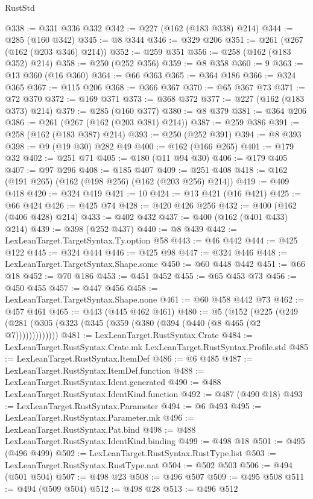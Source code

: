 \begin{lexlean}{RustStd}
\begin{coremodule}
@338 := @331 @336 @332
@342 := @227 (@162 (@183 @338) @214)
@344 := @285 (@160 @342)
@345 := @8 @344
@346 := @329 @206
@351 := @261 (@267 (@162 (@203 @346) @214))
@352 := @259 @351
@356 := @258 (@162 (@183 @352) @214)
@358 := @250 (@252 @356)
@359 := @8 @358
@360 := 9
@363 := @13 @360 (@16 @360)
@364 := @66 @363
@365 := @364 @186
@366 := @324 @365
@367 := @115 @206
@368 := @366 @367
@370 := @65 @367 @73
@371 := @72 @370
@372 := @169 @371
@373 := @368 @372
@377 := @227 (@162 (@183 @373) @214)
@379 := @285 (@160 @377)
@380 := @8 @379
@381 := @364 @206
@386 := @261 (@267 (@162 (@203 @381) @214))
@387 := @259 @386
@391 := @258 (@162 (@183 @387) @214)
@393 := @250 (@252 @391)
@394 := @8 @393
@398 := @9 (@19 @30) @282 @49
@400 := @162 (@166 @265)
@401 := @179 @32
@402 := @251 @71
@405 := @180 (@11 @94 @30)
@406 := @179 @405
@407 := @97 @296
@408 := @185 @407
@409 := @251 @408
@418 := @162 (@191 @265) (@162 (@198 @256) (@162 (@203 @256) @214))
@419 := @409 @418
@420 := @324 @419
@421 := 10
@424 := @13 @421 (@16 @421)
@425 := @66 @424
@426 := @425 @74
@428 := @420 @426 @256
@432 := @400 (@162 (@406 @428) @214)
@433 := @402 @432
@437 := @400 (@162 (@401 @433) @214)
@439 := @398 (@252 @437)
@440 := @8 @439
@442 := LexLeanTarget.TargetSyntax.Ty.option @58
@443 := @46 @442
@444 := @425 @122
@445 := @324 @444
@446 := @425 @98
@447 := @324 @446
@448 := LexLeanTarget.TargetSyntax.Shape.some
@450 := @60 @448 @442
@451 := @66 @18
@452 := @70 @186
@453 := @451 @452
@455 := @65 @453 @73
@456 := @450 @455
@457 := @447 @456
@458 := LexLeanTarget.TargetSyntax.Shape.none
@461 := @60 @458 @442 @73
@462 := @457 @461
@465 := @443 (@445 @462 @461)
@480 := @5
    (@152 (@225 (@249 (@281 (@305 (@323 (@345 (@359 (@380 (@394 (@440 (@8 @465 (@2 @7)))))))))))))
@481 := LexLeanTarget.RustSyntax.Crate
@484 := LexLeanTarget.RustSyntax.Crate.mk LexLeanTarget.RustSyntax.Profile.std
@485 := LexLeanTarget.RustSyntax.ItemDef
@486 := @6 @485
@487 := LexLeanTarget.RustSyntax.ItemDef.function
@488 := LexLeanTarget.RustSyntax.Ident.generated
@490 := @488 LexLeanTarget.RustSyntax.IdentKind.function
@492 := @487 (@490 @18)
@493 := LexLeanTarget.RustSyntax.Parameter
@494 := @6 @493
@495 := LexLeanTarget.RustSyntax.Parameter.mk
@496 := LexLeanTarget.RustSyntax.Pat.bind
@498 := @488 LexLeanTarget.RustSyntax.IdentKind.binding
@499 := @498 @18
@501 := @495 (@496 @499)
@502 := LexLeanTarget.RustSyntax.RustType.list
@503 := LexLeanTarget.RustSyntax.RustType.nat
@504 := @502 @503
@506 := @494 (@501 @504)
@507 := @498 @23
@508 := @496 @507
@509 := @495 @508
@511 := @494 (@509 @504)
@512 := @498 @28
@513 := @496 @512

\end{coremodule}
\end{lexlean}
